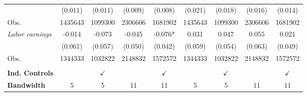 \begin{tabular}{lcccccccc}
						&   \tiny{(0.011)}   &
						    \tiny{(0.011)}   &
						    \tiny{(0.009)}   &
						    \tiny{(0.008)}   &
						    \tiny{(0.021)}   &
						    \tiny{(0.018)}   &
						    \tiny{(0.016)}   &
						    \tiny{(0.014)}   \\
							
Obs.					&	\tiny{1435643}   &
						    \tiny{1099300}   &
						    \tiny{2306606}   &
						    \tiny{1681902}   &
						    \tiny{1435643}   &
						    \tiny{1099300}   &
						    \tiny{2306606}   &
						    \tiny{1681902}   \\



\textit{Labor earnings}   &  -0.014   &
						   -0.073   &
						   -0.045   &
						   -0.076*   &
						   0.031   &
						   0.047   &
						   0.055   &
						   0.021   \\
						   
						&   \tiny{(0.061)}   &
						    \tiny{(0.057)}   &
						    \tiny{(0.050)}   &
						    \tiny{(0.042)}   &
						    \tiny{(0.059)}   &
						    \tiny{(0.054)}   &
						    \tiny{(0.063)}   &
						    \tiny{(0.049)}   \\


Obs.					&	\tiny{1344333}   &
						    \tiny{1032822}   &
						    \tiny{2148832}   &
						    \tiny{1572572}   &
						    \tiny{1344333}   &
						    \tiny{1032822}   &
						    \tiny{2148832}   &
						    \tiny{1572572}   \\

							

\midrule
									& 		&&&&&&& \\

{\bf Ind. Controls}    		    	&	    & $\checkmark$ &
										    & $\checkmark$ &
										    & $\checkmark$ &
										    & $\checkmark$ \\

{\bf Bandwidth}    					&	   5 &
										   5 &
										   11 &
										   11 &
										   5 &
										   5 &
										   11 &
										   11 \\


\bottomrule

\end{tabular}%

